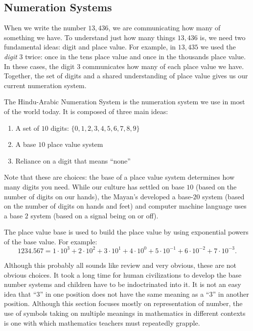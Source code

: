 \documentclass[
]{book}
\providecommand{\tightlist}{%
  \setlength{\itemsep}{0pt}\setlength{\parskip}{0pt}}
\theoremstyle{definition}
\theoremstyle{definition}
\theoremstyle{definition}
\theoremstyle{definition}
\theoremstyle{remark}
\begin{document}
\hypertarget{numeration-systems}{%
\subsection{Numeration Systems}\label{numeration-systems}}

When we write the number \(13,436\), we are communicating how many of something we have. To understand just how many things \(13,436\) is, we need two fundamental ideas: digit and place value. For example, in \(13,435\) we used the \textit{digit} \(3\) twice: once in the tens place value and once in the thousands place value. In these cases, the digit \(3\) communicates how many of each place value we have. Together, the set of digits and a shared understanding of place value gives us our current numeration system.

The Hindu-Arabic Numeration System is the numeration system we use in most of the world today. It is composed of three main ideas:

\begin{enumerate}
\def\labelenumi{\arabic{enumi}.}
\tightlist
\item
  A set of \(10\) digits: \(\{0,1,2,3,4,5,6,7,8,9\}\)
\item
  A base \(10\) place value system
\item
  Reliance on a digit that means ``none''
\end{enumerate}

Note that these are choices: the base of a place value system determines how many digits you need. While our culture has settled on base \(10\) (based on the number of digits on our hands), the Mayan's developed a base-\(20\) system (based on the number of digits on hands and feet) and computer machine language uses a base \(2\) system (based on a signal being on or off).

The place value base is used to build the place value by using exponential powers of the base value. For example:
\[1234.567 = 1 \cdot 10^3 + 2\cdot 10^2 + 3\cdot 10^1 + 4\cdot 10^0 + 5\cdot 10^{-1} + 6 \cdot 10^{-2} + 7 \cdot 10^{-3}.\]

Although this probably all sounds like review and very obvious, these are not obvious choices. It took a long time for human civilizations to develop the base number systems and children have to be indoctrinated into it. It is not an easy idea that ``3'' in one position does not have the same meaning as a ``3'' in another position. Although this section focuses mostly on representation of number, the use of symbols taking on multiple meanings in mathematics in different contexts is one with which mathematics teachers must repeatedly grapple.
\end{document}
